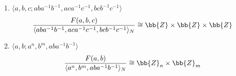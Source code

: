 \begin{ejemplo}
\begin{enumerate}
        \item $\langle a,b,c ; aba^{-1}b^{-1}, aca^{-1}c^{-1}, bcb^{-1}c^{-1}\rangle$
        \begin{gather*}
            \frac{F(a,b,c)}{\langle aba^{-1}b^{-1}, aca^{-1}c^{-1}, bcb^{-1}c^{-1}\rangle_N} \cong \bb{Z}\times \bb{Z}\times \bb{Z}
        \end{gather*}

        \item $\langle a,b; a^n, b^m, aba^{-1}b^{-1}\rangle$
        \begin{gather*}
            \frac{F(a,b)}{\langle a^n, b^m, aba^{-1}b^{-1}\rangle_N} \cong \bb{Z}_n \times \bb{Z}_m
        \end{gather*}
    \end{enumerate}
\end{ejemplo}

